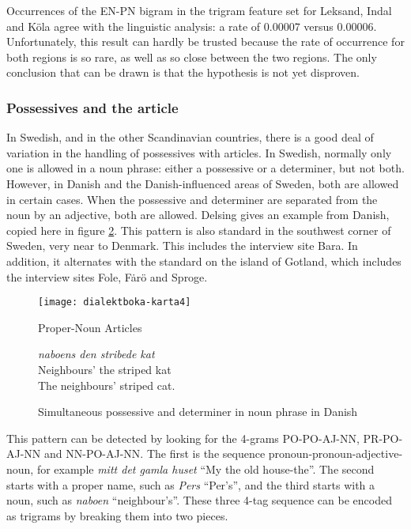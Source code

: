 Occurrences of the EN-PN bigram in the trigram feature set for
Leksand, Indal and K\"ola agree with the linguistic analysis: a rate
of 0.00007 versus 0.00006. Unfortunately, this result can hardly be
trusted because the rate of occurrence for both regions is so rare, as
well as so close between the two regions. The only conclusion that can
be drawn is that the hypothesis is not yet disproven.

\subsubsection{Possessives and the article}

In Swedish, and in the other Scandinavian countries, there is a good
deal of variation in the handling of possessives with articles. In
Swedish, normally only one is allowed in a noun phrase: either a
possessive or a determiner, but not both. However, in Danish and the
Danish-influenced areas of Sweden, both are allowed in certain
cases. When the possessive and determiner are separated from the noun
by an adjective, both are allowed. Delsing gives an example from
Danish, copied here in figure \ref{possessive-plus-article-example}.
This pattern is also standard in the southwest corner of Sweden, very
near to Denmark. This includes the interview site Bara. In addition,
it alternates with the standard on the island of Gotland, which
includes the interview sites Fole, F\.ar\"o and Sproge.

\begin{figure}
  \texttt{[image: dialektboka-karta4]}
  \caption{Proper-Noun Articles}
  \label{possessive-plus-article-map}
\end{figure}

\begin{figure}
  {\it naboens den stribede kat} \\
  Neighbours' the striped kat \\
  The neighbours' striped cat.
  \caption{Simultaneous possessive and determiner in noun phrase in
    Danish}
  \label{possessive-plus-article-example}
\end{figure}

This pattern can be detected by looking for the
4-grams PO-PO-AJ-NN, PR-PO-AJ-NN and NN-PO-AJ-NN. The first is the
sequence pronoun-pronoun-adjective-noun, for example {\it mitt det
  gamla huset} ``My the old house-the''. The second starts with a
proper name, such as {\it Pers} ``Per's'', and the third starts with a
noun, such as {\it naboen} ``neighbour's''. These three 4-tag sequence
can be encoded as trigrams by breaking them into two pieces.

